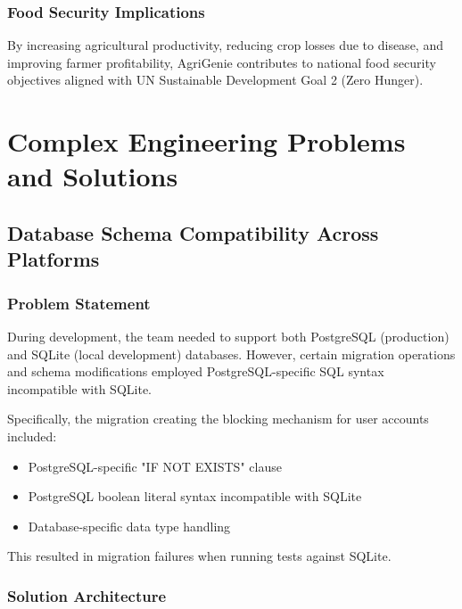 \documentclass[12pt,a4paper]{report}
\begin{document}
\subsection{Food Security Implications}

By increasing agricultural productivity, reducing crop losses due to disease, and improving farmer profitability, AgriGenie contributes to national food security objectives aligned with UN Sustainable Development Goal 2 (Zero Hunger).

\newpage

\chapter{Complex Engineering Problems and Solutions}

\section{Database Schema Compatibility Across Platforms}

\subsection{Problem Statement}

During development, the team needed to support both PostgreSQL (production) and SQLite (local development) databases. However, certain migration operations and schema modifications employed PostgreSQL-specific SQL syntax incompatible with SQLite.

Specifically, the migration creating the blocking mechanism for user accounts included:
\begin{itemize}
    \item PostgreSQL-specific "IF NOT EXISTS" clause
    \item PostgreSQL boolean literal syntax incompatible with SQLite
    \item Database-specific data type handling
\end{itemize}

This resulted in migration failures when running tests against SQLite.

\subsection{Solution Architecture}
\end{document}
